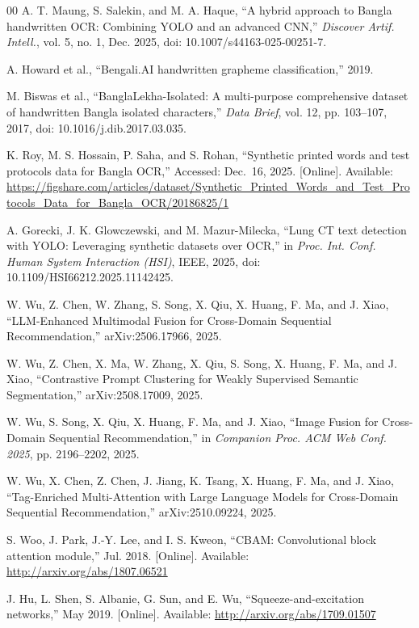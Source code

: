 \documentclass{ieeeaccess}
\begin{document}
{\begin{thebibliography}{00}
 A. T. Maung, S. Salekin, and M. A. Haque, ``A hybrid approach to
  Bangla handwritten OCR: Combining YOLO and an advanced CNN,''
  \textit{Discover Artif. Intell.}, vol. 5, no. 1, Dec. 2025,
  doi: 10.1007/s44163-025-00251-7.

 A. Howard et al., ``Bengali.AI handwritten grapheme
  classification,'' 2019.

 M. Biswas et al., ``BanglaLekha-Isolated: A multi-purpose
  comprehensive dataset of handwritten Bangla isolated characters,''
  \textit{Data Brief}, vol. 12, pp. 103--107, 2017,
  doi: 10.1016/j.dib.2017.03.035.

 K. Roy, M. S. Hossain, P. Saha, and S. Rohan, ``Synthetic printed
  words and test protocols data for Bangla OCR,'' Accessed: Dec.~16, 2025.
  [Online]. Available:
  \url{https://figshare.com/articles/dataset/Synthetic_Printed_Words_and_Test_Protocols_Data_for_Bangla_OCR/20186825/1}

 A. Gorecki, J. K. Glowczewski, and M. Mazur-Milecka, ``Lung CT
  text detection with YOLO: Leveraging synthetic datasets over OCR,'' in
  \textit{Proc. Int. Conf. Human System Interaction (HSI)}, IEEE, 2025,
  doi: 10.1109/HSI66212.2025.11142425.

 W. Wu, Z. Chen, W. Zhang, S. Song, X. Qiu, X. Huang, F. Ma, and J. Xiao, ``LLM-Enhanced Multimodal Fusion for Cross-Domain Sequential Recommendation,'' arXiv:2506.17966, 2025.

 W. Wu, Z. Chen, X. Ma, W. Zhang, X. Qiu, S. Song, X. Huang, F. Ma, and J. Xiao, ``Contrastive Prompt Clustering for Weakly Supervised Semantic Segmentation,'' arXiv:2508.17009, 2025.

 W. Wu, S. Song, X. Qiu, X. Huang, F. Ma, and J. Xiao, ``Image Fusion for Cross-Domain Sequential Recommendation,'' in \textit{Companion Proc. ACM Web Conf. 2025}, pp. 2196--2202, 2025.

 W. Wu, X. Chen, Z. Chen, J. Jiang, K. Tsang, X. Huang, F. Ma, and J. Xiao, ``Tag-Enriched Multi-Attention with Large Language Models for Cross-Domain Sequential Recommendation,'' arXiv:2510.09224, 2025.

 S. Woo, J. Park, J.-Y. Lee, and I. S. Kweon, ``CBAM: Convolutional
  block attention module,'' Jul. 2018. [Online]. Available:
  \url{http://arxiv.org/abs/1807.06521}

 J. Hu, L. Shen, S. Albanie, G. Sun, and E. Wu,
  ``Squeeze-and-excitation networks,'' May 2019. [Online]. Available:
  \url{http://arxiv.org/abs/1709.01507}


\end{thebibliography}}
\end{document}
